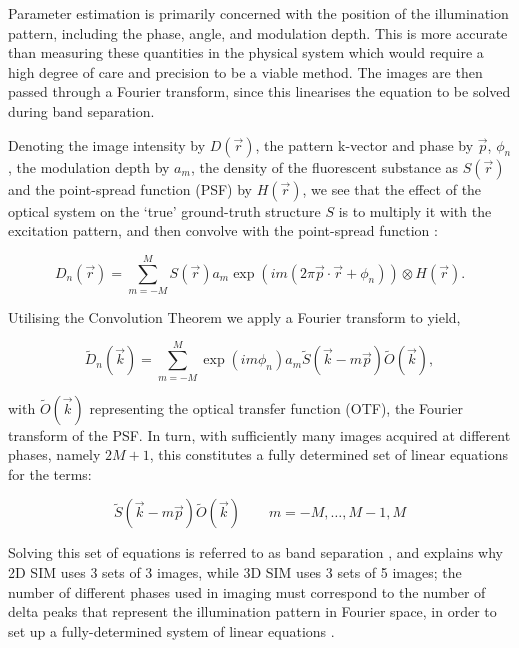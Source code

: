 \documentclass[12pt]{article}
\begin{document}
Parameter estimation is primarily concerned with the position of the illumination pattern,
including the phase, angle, and modulation depth.
This is more accurate than measuring these quantities in the physical system which would require a high degree of care and precision to be a viable method.
The images are then passed through a Fourier transform,
since this linearises the equation to be solved during band separation.

Denoting the image intensity by $D(\vec{r})$, the pattern k-vector and phase by $\vec{p}$, $\phi_n$,
the modulation depth by $a_m$, the density of the fluorescent substance as $S(\vec{r})$ and the point-spread function (PSF) by $H(\vec{r})$,
we see that the effect of the optical system on the `true' ground-truth structure $S$ is to multiply it with the excitation pattern,
and then convolve with the point-spread function \cite{SIM2008}:

\[D_n(\vec{r}) = \sum_{m=-M}^{M}{S(\vec{r})a_m\exp(im(2\pi\vec{p}\cdot\vec{r}+\phi_n))\otimes H(\vec{r})}.\]

Utilising the Convolution Theorem \cite{convthm} we apply a Fourier transform to yield,

\[\tilde{D}_n(\vec{k}) = \sum_{m=-M}^{M}{\exp(im\phi_n)a_m\tilde{S}(\vec{k}-m\vec{p})\tilde{O}(\vec{k})},\]

with $\tilde{O}(\vec{k})$ representing the optical transfer function (OTF), the Fourier transform of the PSF.
In turn, with sufficiently many images acquired at different phases, namely $2M+1$, this constitutes a fully determined set of linear equations for the terms:

\[\tilde{S}(\vec{k}-m\vec{p})\tilde{O}(\vec{k})\qquad m=-M,\dots,M-1,M\]

Solving this set of equations is referred to as band separation \cite{SIM2008},
and explains why 2D SIM uses 3 sets of 3 images, while 3D SIM uses 3 sets of 5 images;
the number of different phases used in imaging must correspond to the number of delta peaks that represent the illumination pattern in Fourier space,
in order to set up a fully-determined system of linear equations \cite{params}.
\end{document}
